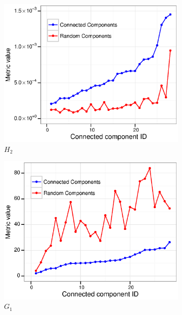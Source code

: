 \begin{figure}
  \begin{subfigure}[b]{0.3\textwidth}
    \includegraphics[width=\textwidth]{figures_supp/Plots_from_data/cc_validation/H2.eps}
    \caption{$H_2$} \label{fig:H2}
  \end{subfigure}
  \begin{subfigure}[b]{0.3\textwidth}
    \includegraphics[width=\textwidth]{figures_supp/Plots_from_data/cc_validation/G1.eps}
    \caption{$G_1$} \label{fig:G1}
  \end{subfigure} ~ %
  \begin{subfigure}[b]{0.3\textwidth}

\end{subfigure}
\end{figure}
